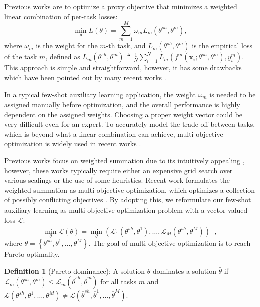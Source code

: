 \documentclass[final]{cvpr}
\begin{document}
Previous works \cite{DvornikMS19,GidarisBKPC19} are to optimize a proxy objective that minimizes a weighted linear combination of per-task losses:
\begin{equation}
\min _{\theta} {L}(\theta)=\sum_{m=1}^{M} {\omega}_{m} {L}_{m}(\theta^{s h},{\theta}^{m}),
\end{equation}
where $\omega_m$ is the weight for the $m$-th task, and ${{L}}_{m}\left({\theta}^{s h}, {\theta}^{m}\right)$ is the empirical loss of the task $m$, defined as ${{L}}_{m}\left({\theta}^{s h}, {\theta}^{m}\right) \triangleq \frac{1}{N} \sum_{i=1}^N {L}_m\left(f^{m}\left(\mathbf{x}_{i} ; {\theta}^{s h}, {\theta}^{m}\right), y_{i}^{m}\right)$. 
This approach is simple and straightforward, however, it has some drawbacks which have been pointed out by many recent works \cite{LinZ0ZK19,ma2020continuous}.  

In a typical few-shot auxiliary learning application, the weight $\omega_m$ is needed to be assigned manually before optimization, and the overall performance is highly dependent on the assigned weights. Choosing a proper weight vector could be very difficult even for an expert.
To accurately model the trade-off between tasks, which is beyond what a linear combination can achieve, multi-objective optimization is widely used in recent works \cite{LinZ0ZK19,ma2020continuous}.
 
Previous works focus on weighted summation due to its intuitively appealing \cite{DvornikMS19,GidarisBKPC19,ChenDTTD2021},
however, these works typically require either an expensive grid search over various scalings or the use of some heuristics.
Recent work formulates the weighted summation as multi-objective optimization, which optimizes a collection of possibly conflicting objectives \cite{LinZ0ZK19}. 
By adopting this, we reformulate our few-shot auxiliary learning  as multi-objective optimization problem with  
a vector-valued loss $\mathcal{L}$:
\begin{equation}
\min _{{\theta}} \mathcal{L}\left({\theta} \right) = \min _{{\theta}} \left({\mathcal{L}}_{1}\left({\theta}^{s h}, {\theta}^{1}\right), \ldots, {\mathcal{L}}_{M}\left({\theta}^{s h}, {\theta}^{M}\right)\right)^{\top},  
\end{equation}
where
${\theta} = \left\{ {\theta}^{s h},{\theta}^{1}, \ldots, {\theta}^{M} \right\}$. The goal of multi-objective optimization is to reach Pareto optimality.

\textbf{Definition 1} (Pareto dominance): A solution $\theta$ dominates a solution $\bar{\theta}$ if ${\mathcal{L}}_{m}\left({\theta}^{s h}, {\theta}^{m}\right) \leq {\mathcal{L}}_{m}\left(\overline{{\theta}}^{s h}, \overline{{\theta}}^{m}\right)$ for all tasks $m$ and $\mathcal{L}\left({\theta}^{s h}, {\theta}^{1}, \ldots, {\theta}^{M}\right) \neq \mathcal{L}\left(\overline{{\theta}}^{s h}, \overline{{\theta}}^{1}, \ldots, \overline{{\theta}}^{M}\right)$.
\end{document}
